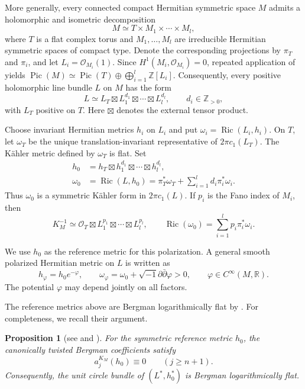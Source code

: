 \documentclass[11pt,reqno]{amsart}
\theoremstyle{corollary}
\theoremstyle{conjecture}
\theoremstyle{assumption}
\theoremstyle{proposition}
\newtheorem{proposition}[theorem]{Proposition}
\theoremstyle{remark}
\numberwithin{equation}{section}
\newcommand{\ii}{\ensuremath{\sqrt{-1}}}
\newcommand{\pa}{\partial}
\newcommand{\pp}{\bar\partial}
\DeclareMathOperator{\Ric}{Ric}
\begin{document}
More generally, every connected compact Hermitian symmetric space $M$ admits a holomorphic and isometric decomposition
\[
M\simeq T\times M_1\times\cdots\times M_l,
\]
where $T$ is a flat complex torus and $M_1,\ldots,M_l$ are irreducible Hermitian symmetric spaces of compact type. Denote the corresponding projections by $\pi_T$ and $\pi_i$, and let $L_i=\mathcal O_{M_i}(1)$. Since $H^1(M_i,\mathcal O_{M_i})=0$, repeated application of \cite[Chapter~III, Exercise~12.6]{Hartshorne1977} yields $\operatorname{Pic}(M)\simeq\operatorname{Pic}(T)\oplus\bigoplus_{i=1}^{l}\mathbb Z[L_i]$. Consequently, every positive holomorphic line bundle $L$ on $M$ has the form
\begin{equation}\label{eq:general-product-polarization}
L\simeq L_T\boxtimes L_1^{d_1}\boxtimes\cdots\boxtimes L_l^{d_l},\qquad d_i\in\mathbb Z_{>0},
\end{equation}
with $L_T$ positive on $T$. Here $\boxtimes$ denotes the external tensor product.

Choose invariant Hermitian metrics $h_i$ on $L_i$ and put $\omega_i=\Ric(L_i,h_i)$. On $T$, let $\omega_T$ be the unique translation-invariant representative of $2\pi c_1(L_T)$. The K\"ahler metric defined by $\omega_T$ is flat. Set
\begin{equation}\label{eq:general-reference-metric}
\begin{split}
h_0&=h_T\boxtimes h_1^{d_1}\boxtimes\cdots\boxtimes h_l^{d_l},\\
\omega_0&=\Ric(L,h_0)=\pi_T^*\omega_T+\sum_{i=1}^{l}d_i\pi_i^*\omega_i.
\end{split}
\end{equation}
Thus $\omega_0$ is a symmetric K\"ahler form in $2\pi c_1(L)$. If $p_i$ is the Fano index of $M_i$, then
\[
K_M^{-1}\simeq\mathcal O_T\boxtimes L_1^{p_1}\boxtimes\cdots\boxtimes L_l^{p_l}, \qquad \Ric(\omega_0)=\sum_{i=1}^{l}p_i\pi_i^*\omega_i.
\]

We use $h_0$ as the reference metric for this polarization. A general smooth polarized Hermitian metric on $L$ is written as
\[
h_\varphi=h_0e^{-\varphi},\qquad \omega_\varphi=\omega_0+\ii\pa\pp\varphi>0, \qquad \varphi\in C^\infty(M,\mathbb R).
\]
The potential $\varphi$ may depend jointly on all factors.

The reference metrics above are Bergman logarithmically flat by \cite{EnglisZhang2010,EbenfeltXiaoXu2026}. For completeness, we recall their argument.


\begin{proposition}[see {\cite[Theorem~3.5]{EnglisZhang2010}} and {\cite[Corollary~1.13]{EbenfeltXiaoXu2026}}]
\label{prop:symmetric-reference-log-flat}
For the symmetric reference metric $h_0$, the canonically twisted Bergman coefficients satisfy
\[
a^{K_M}_j(h_0)\equiv0\qquad(j\ge n+1).
\]
Consequently, the unit circle bundle of $(L^*,h_0^*)$ is Bergman logarithmically flat.
\end{proposition}
\end{document}
